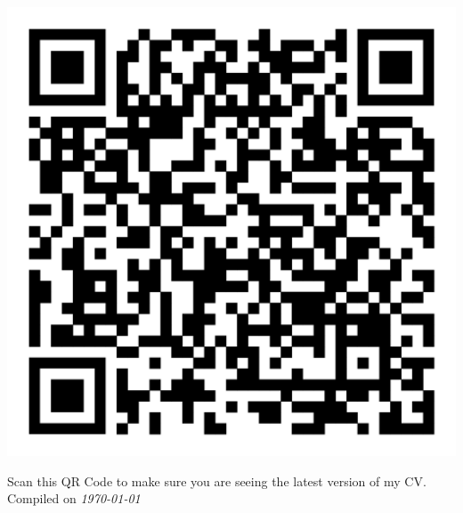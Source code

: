 \documentclass[9pt]{developercv} %
\begin{document}
\begin{minipage}[t]{0.35\textwidth}
	\vspace{-\baselineskip} %
	\\
	\divider\\
	\begin{minipage}[t]{0.25\textwidth}
		\vspace{-\baselineskip} %
		\includegraphics[width=1\linewidth]{assets/websiteqr.png}
	\end{minipage}
	\hfill
	\begin{minipage}[t]{0.75\textwidth}
		\vspace{-\baselineskip} %
		Scan this QR Code to make sure you are seeing the latest version of my CV.\\
		Compiled on \textit{\today}\\
	\end{minipage}
\end{minipage}
\hfill
\end{document}
